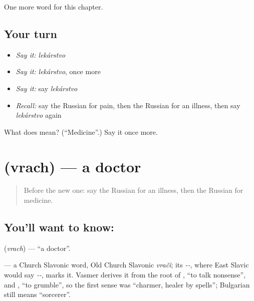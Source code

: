 \begin{grammarlens}[title={What you've built}]
One more word for this chapter.
\end{grammarlens}

\subsection*{Your turn}
\begin{itemize}
\raggedright
  \item \emph{Say it:} \emph{lekárstvo}
  \item \emph{Say it:} \emph{lekárstvo}, once more
  \item \emph{Say it:} say \emph{lekárstvo}
  \item \emph{Recall:} say the Russian for pain, then the Russian for an illness, then say \emph{lekárstvo} again
\end{itemize}

\begin{tcolorbox}[breakable,colback=teal!4,colframe=teal!35!black,title={Before you move on}]
What does  mean? (\textquotedblleft{}Medicine\textquotedblright{}.) Say it once more.
\end{tcolorbox}
\section[\texorpdfstring{\ru{врач} (vrach)}{врач (vrach)}]{ (vrach) — a doctor}

\label{lesson:RU-C32-doctor}



\begin{quote}
Before the new one: say the Russian for an illness, then the Russian for medicine.
\end{quote}

\subsection*{You'll want to know: }
\textbf{} (\emph{vrach}) — \textquotedblleft{}a doctor\textquotedblright{}.

\begin{cousinweb}
\textbf{} — a Church Slavonic word, Old Church Slavonic \emph{vračĭ}; its \emph{--}, where East Slavic would say \emph{--}, marks it. Vasmer derives it from the root of \emph{}, \textquotedblleft{}to talk nonsense\textquotedblright{}, and \emph{}, \textquotedblleft{}to grumble\textquotedblright{}, so the first sense was \textquotedblleft{}charmer, healer by spells\textquotedblright{}; Bulgarian \emph{} still means \textquotedblleft{}sorcerer\textquotedblright{}.
\end{cousinweb}

